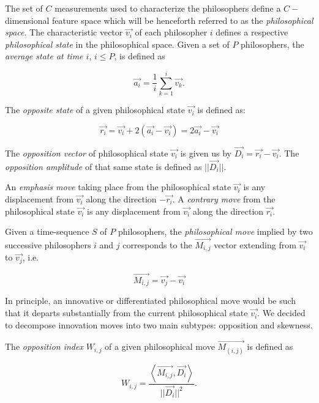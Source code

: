 \documentclass[%
 aip,
 jmp,%
 amsmath,amssymb,
 reprint,%
]{revtex4-1}
\begin{document}
The set of $C$ measurements used to characterize the philosophers
define a $C-$dimensional feature space which will be henceforth
referred to as the \emph{philosophical space}.  The characteristic
vector $\vec{v_i}$ of each philosopher $i$ defines a respective
\emph{philosophical state} in the philosophical space.  Given a set of
$P$ philosophers, the \emph{average state at time $i$}, $i \leq P$, is
defined as

\begin{equation}
  \vec{a_i} = \frac{1}{i}\sum_{k=1}^i\vec{v_k}.
\end{equation}

The \emph{opposite state} of a given philosophical state $\vec{v_i}$
is defined as:

\begin{equation}
  \vec{r_i} = \vec{v_i} + 2(\vec{a_i} - \vec{v_i})  = 2 \vec{a_i} - \vec{v_i}
\end{equation}

The \emph{opposition vector} of philosophical state $\vec{v_i}$ is
given us by $\vec{D_i}=\vec{r_i} - \vec{v_i}$.  The \emph{opposition
amplitude} of that same state is defined as $|| \vec{D_i} ||$.

An \emph{emphasis move} taking place from the philosophical state
$\vec{v_i}$ is any displacement from $\vec{v_i}$ along the direction
$-\vec{r_i}$.  A \emph{contrary move} from the philosophical state
$\vec{v_i}$ is any displacement from $\vec{v_i}$ along the direction
$\vec{r_i}$.

Given a time-sequence $S$ of $P$ philosophers, the \emph{philosophical
move} implied by two successive philosophers $i$ and $j$ corresponds
to the $\vec{M_{i,j}}$ vector extending from $\vec{v_i}$ to
$\vec{v_j}$, i.e.

\begin{equation}
  \vec{M_{i,j}} = \vec{v_j} - \vec{v_i}
\end{equation}

In principle, an innovative or differentiated philosophical move would
be such that it departs substantially from the current philosophical
state $\vec{v_i}$.  We decided to decompose innovation moves into two
main subtypes: opposition and skewness.

The \emph{opposition index} $W_{i,j}$ of a given philosophical move
$\vec{M_{(i,j)}}$ is defined as

\begin{equation}
  W_{i,j} = \frac{\left< \vec{M_{i,j}}, \vec{D_i}\right>}{||\vec{D_i}||^2}. 
\end{equation}
\end{document}
